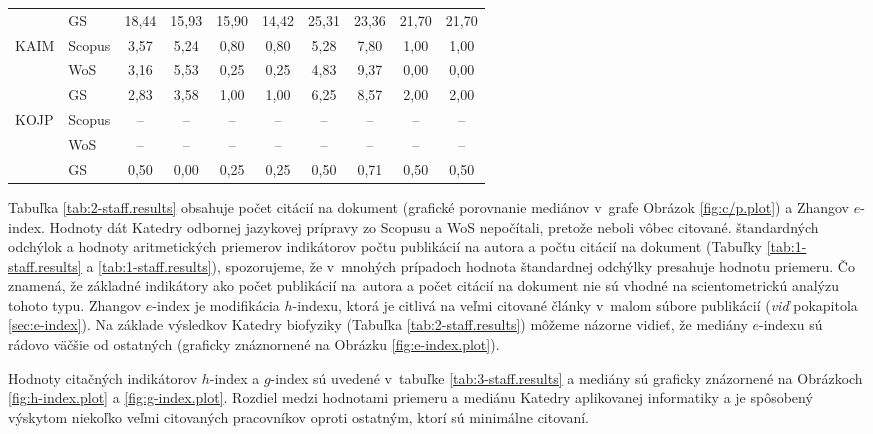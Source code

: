 \begin{table}
\begin{tabularx}{\textwidth}{XXcccc@{\hspace{3ex}}cccc}
         & GS     & 18,44 & 15,93 & 15,90 & 14,42 & 25,31 & 23,36 & 21,70 & 21,70 \\[3ex]
    KAIM & Scopus & 3,57  & 5,24  & 0,80  & 0,80  & 5,28  & 7,80  & 1,00  & 1,00  \\
         & WoS    & 3,16  & 5,53  & 0,25  & 0,25  & 4,83  & 9,37  & 0,00  & 0,00  \\
         & GS     & 2,83  & 3,58  & 1,00  & 1,00  & 6,25  & 8,57  & 2,00  & 2,00  \\[3ex]
    KOJP & Scopus & --    & --    & --    & --    & --    & --    & --    & --    \\
         & WoS    & --    & --    & --    & --    & --    & --    & --    & --    \\
         & GS     & 0,50  & 0,00  & 0,25  & 0,25  & 0,50  & 0,71  & 0,50  & 0,50  \\[0.5ex]
    \bottomrule
  \end{tabularx}
\end{table}

Tabuľka \ref{tab:2-staff.results} obsahuje počet citácií na dokument (grafické
porovnanie mediánov v~grafe Obrázok \ref{fig:c/p.plot}) a Zhangov $e$-index.
Hodnoty dát Katedry odbornej jazykovej prípravy zo Scopusu a WoS nepočítali,
pretože neboli vôbec citované.  štandardných odchýlok a hodnoty aritmetických
priemerov indikátorov počtu publikácií na autora a počtu citácií na dokument
(Tabuľky \ref{tab:1-staff.results} a \ref{tab:1-staff.results}), spozorujeme, že
v~mnohých prípadoch hodnota štandardnej odchýlky presahuje hodnotu priemeru.  Čo
znamená, že základné indikátory ako počet publikácií na~autora a počet citácií
na dokument nie sú vhodné na scientometrickú analýzu tohoto typu.  Zhangov
$e$-index  je modifikácia $h$-indexu, ktorá je citlivá na veľmi citované články
v~malom súbore publikácií (\emph{viď} pokapitola \ref{sec:e-index}).  Na základe
výsledkov Katedry biofyziky (Tabuľka \ref{tab:2-staff.results}) môžeme názorne
vidieť, že mediány $e$-indexu sú rádovo väčšie od ostatných (graficky
znáznornené na Obrázku \ref{fig:e-index.plot}).

Hodnoty citačných indikátorov $h$-index a $g$-index sú uvedené v~tabuľke
\ref{tab:3-staff.results} a mediány sú graficky znázornené na Obrázkoch
\ref{fig:h-index.plot} a \ref{fig:g-index.plot}.  Rozdiel medzi hodnotami
priemeru a mediánu Katedry aplikovanej informatiky a je spôsobený výskytom
niekoľko veľmi citovaných pracovníkov oproti ostatným, ktorí sú minimálne
citovaní.

